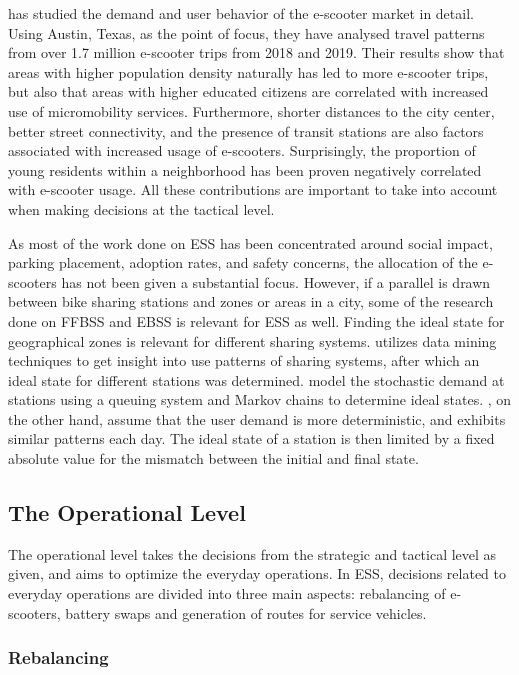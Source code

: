 \citet{jiao_understanding_2020} has studied the demand and user behavior of the e-scooter market in detail. Using Austin, Texas, as the point of focus, they have analysed travel patterns from over 1.7 million e-scooter trips from 2018 and 2019. Their results show that areas with higher population density naturally has led to more e-scooter trips, but also that areas with higher educated citizens are correlated with increased use of micromobility services. Furthermore, shorter distances to the city center, better street connectivity, and the presence of transit stations are also factors associated with increased usage of e-scooters. Surprisingly, the proportion of young residents within a neighborhood has been proven negatively correlated with e-scooter usage. All these contributions are important to take into account when making decisions at the tactical level.

As most of the work done on ESS has been concentrated around social impact, parking placement, adoption rates, and safety concerns, the allocation of the e-scooters has not been given a substantial focus. However, if a parallel is drawn between bike sharing stations and zones or areas in a city, some of the research done on FFBSS and EBSS is relevant for ESS as well. Finding the ideal state for geographical zones is relevant for different sharing systems. \citet{vogel_service_2016} utilizes data mining techniques to get insight into use patterns of sharing systems, after which an ideal state for different stations was determined. \citet{schuijbroek_inventory_2017} model the stochastic demand at stations using a queuing system and Markov chains to determine ideal states. \citet{paias_service_2016}, on the other hand, assume that the user demand is more deterministic, and exhibits similar patterns each day. The ideal state of a station is then limited by a fixed absolute value for the mismatch between the initial and final state.

\subsection{The Operational Level}
The operational level takes the decisions from the strategic and tactical level as given, and aims to optimize the everyday operations. In ESS, decisions related to everyday operations are divided into three main aspects: rebalancing of e-scooters, battery swaps and generation of routes for service vehicles. 

\subsubsection{Rebalancing}

